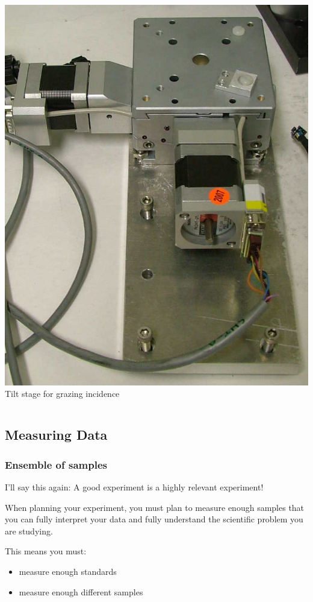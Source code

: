 \documentclass[10pt, xcolor=x11names, compress]{beamer}
\begin{document}
\begin{frame}
\begin{columns}[T]
\begin{column}{0.25\linewidth}
\begin{center}
        \includegraphics[width=0.6 \linewidth]{exp/tilt.jpg}\\
        Tilt stage for grazing incidence
      \end{center}
    \end{column}
  \end{columns}
\end{frame}

\subsection{Measuring Data}

\begin{frame}
  \frametitle{Ensemble of samples}
  \begin{exampleblock}{I'll say this again:}
      A good experiment is a highly relevant experiment!
  \end{exampleblock}
  
  \bigskip

  When planning your experiment, you must plan to measure enough
  samples that you can fully interpret your data and fully understand
  the scientific problem you are studying.

  \bigskip

  This means you  must:
  \begin{itemize}
  \item measure enough standards
  \item measure enough different samples
  \end{itemize}

\end{frame}
\end{document}
